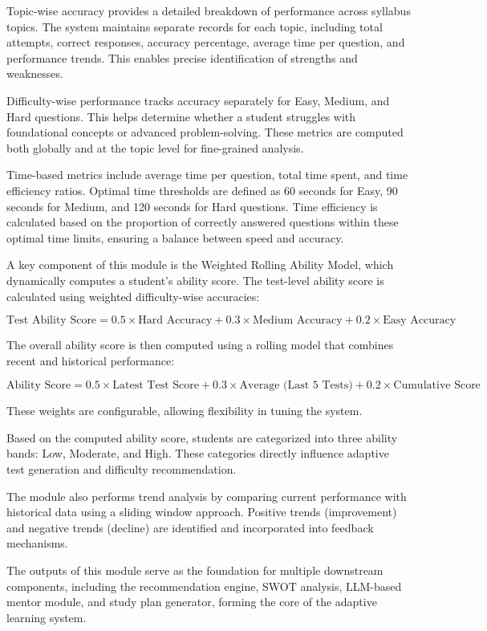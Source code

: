 \begin{sloppypar}
Topic-wise accuracy provides a detailed breakdown of performance across syllabus topics. The system maintains separate records for each topic, including total attempts, correct responses, accuracy percentage, average time per question, and performance trends. This enables precise identification of strengths and weaknesses.

Difficulty-wise performance tracks accuracy separately for Easy, Medium, and Hard questions. This helps determine whether a student struggles with foundational concepts or advanced problem-solving. These metrics are computed both globally and at the topic level for fine-grained analysis.

Time-based metrics include average time per question, total time spent, and time efficiency ratios. Optimal time thresholds are defined as 60 seconds for Easy, 90 seconds for Medium, and 120 seconds for Hard questions. Time efficiency is calculated based on the proportion of correctly answered questions within these optimal time limits, ensuring a balance between speed and accuracy.

A key component of this module is the Weighted Rolling Ability Model, which dynamically computes a student's ability score. The test-level ability score is calculated using weighted difficulty-wise accuracies:

\[
\text{Test Ability Score} = 0.5 \times \text{Hard Accuracy} + 0.3 \times \text{Medium Accuracy} + 0.2 \times \text{Easy Accuracy}
\]

The overall ability score is then computed using a rolling model that combines recent and historical performance:

\[
\text{Ability Score} = 0.5 \times \text{Latest Test Score} + 0.3 \times \text{Average (Last 5 Tests)} + 0.2 \times \text{Cumulative Score}
\]

These weights are configurable, allowing flexibility in tuning the system.

Based on the computed ability score, students are categorized into three ability bands: Low, Moderate, and High. These categories directly influence adaptive test generation and difficulty recommendation.

The module also performs trend analysis by comparing current performance with historical data using a sliding window approach. Positive trends (improvement) and negative trends (decline) are identified and incorporated into feedback mechanisms.

The outputs of this module serve as the foundation for multiple downstream components, including the recommendation engine, SWOT analysis, LLM-based mentor module, and study plan generator, forming the core of the adaptive learning system.


\end{sloppypar}
